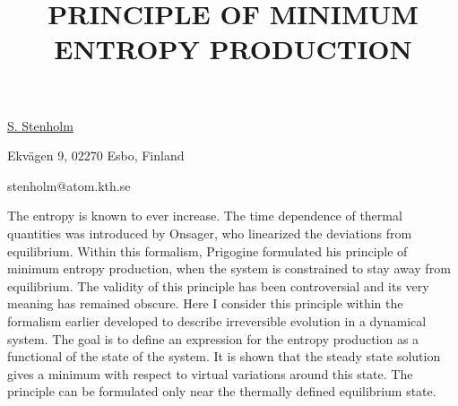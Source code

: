 \title{PRINCIPLE OF MINIMUM ENTROPY PRODUCTION}

\underline{S. Stenholm} 

{\normalsize{\vspace{-4mm}
Ekv\"{a}gen 9, 02270 Esbo, Finland

\email stenholm@atom.kth.se}}

The entropy is known to ever increase. The time dependence of thermal quantities was introduced by Onsager, who linearized the deviations from equilibrium. Within this formalism, Prigogine formulated his principle of minimum entropy production, when the system is constrained to stay away from equilibrium. The validity of this principle has been controversial and its very meaning has remained obscure. Here I consider this principle within the formalism earlier developed to describe irreversible evolution in a dynamical system. The goal is to define an expression for the entropy production as a functional of the state of the system. It is shown that the steady state solution gives a minimum with respect to virtual variations around this state. The principle can be formulated only near the thermally defined equilibrium state.

\vspace{\baselineskip}